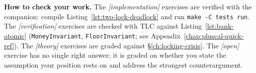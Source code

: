 \textbf{How to check your work.} The \emph{[implementation]} exercises are
verified with the companion: compile Listing~\ref{lst:two-lock-deadlock} and
run \texttt{make -C tests run}.  The \emph{[verification]} exercises are
checked with TLC against Listing~\ref{lst:bank-atomic}
(\texttt{MoneyInvariant}, \texttt{FloorInvariant}; see
Appendix~\ref{chap:pluscal-quick-ref}).  The \emph{[theory]} exercises are
graded against \S\ref{ch:locking-crisis}.  The \emph{[open]} exercise has
no single right answer; it is graded on whether you state the assumption
your position rests on and address the strongest counterargument.

